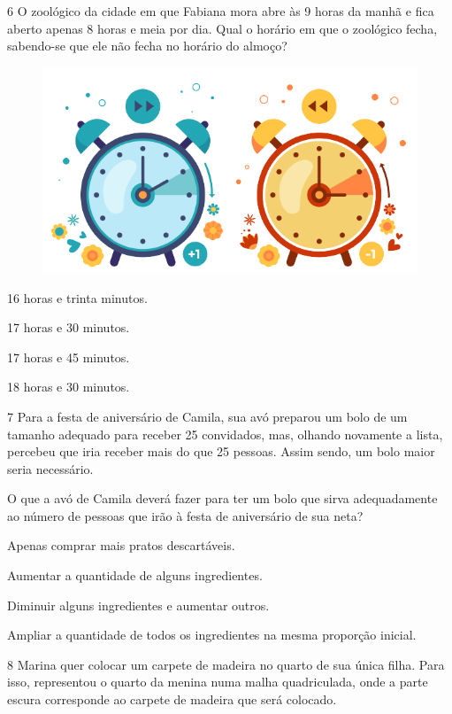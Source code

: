 \num{6} O zoológico da cidade em que Fabiana mora abre às 9 horas da manhã e fica aberto apenas 8 horas e meia por dia. Qual o horário em que o zoológico fecha, sabendo-se que ele não fecha no horário do almoço?

\begin{figure}[htpb!]
\centering
\includegraphics[width=.5\textwidth]{./media/image107d.png}
\end{figure}


\begin{escolha}
\item
  16 horas e trinta minutos.
\item
  17 horas e 30 minutos.
\item
  17 horas e 45 minutos.
\item
  18 horas e 30 minutos.
\end{escolha}

\pagebreak
\num{7} Para a festa de aniversário de Camila, sua avó preparou um bolo de um tamanho adequado para receber 25 convidados, mas, olhando novamente a lista, percebeu que iria receber mais do que 25 pessoas. Assim sendo, um bolo maior seria necessário.

O que a avó de Camila deverá fazer para ter um bolo que sirva adequadamente ao número de pessoas que irão à festa de aniversário de sua neta?

\begin{escolha}
\item
  Apenas comprar mais pratos descartáveis.
\item
  Aumentar a quantidade de alguns ingredientes.
\item
  Diminuir alguns ingredientes e aumentar outros.
\item
  Ampliar a quantidade de todos os ingredientes na mesma proporção inicial.
\end{escolha}


\num{8} Marina quer colocar um carpete de madeira no quarto de sua única filha.
Para isso, representou o quarto da menina numa malha quadriculada, onde a parte escura corresponde ao carpete de madeira que será
colocado.

